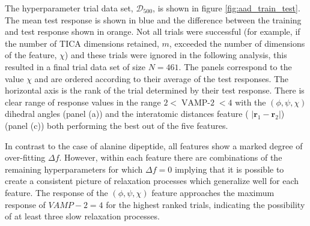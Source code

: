 The hyperparameter trial data set, $\mathcal{D}_{500}$, is shown in figure \ref{fig:aad_train_test}. The mean test response is shown in blue and the difference between the training and test response shown in orange. Not all trials were successful (for example, if the number of TICA dimensions retained, $m$, exceeded the number of dimensions of the feature, $\chi$) and these trials were ignored in the following analysis, this resulted in a final trial data set of size $N=461$. The panels correspond to the value $\chi$ and are ordered according to their average of the test responses. The horizontal axis is the rank of the trial determined by their test response. There is clear range of response values in the range $2 < \operatorname{VAMP-2} < 4$ with the $(\phi, \psi, \chi)$ dihedral angles  (panel (a)) and the interatomic distances feature ( $\left|\mathbf{r}_{1}-\mathbf{r}_{2}\right|$) (panel (c)) both performing the best out of the five features. 

In contrast to the case of alanine dipeptide, all features show a marked degree of over-fitting $\Delta f$. However, within each feature there are combinations of the remaining hyperparameters for which $\Delta f=0$ implying that it is possible to create a consistent picture of relaxation processes which generalize well for each feature. The response of the $(\phi, \psi, \chi)$ feature  approaches the maximum response of $VAMP-2 = 4$ for the highest ranked trials, indicating the possibility of at least three slow relaxation processes. 

